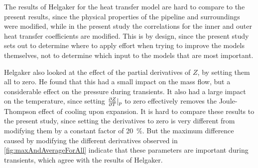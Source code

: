 The results of Helgaker for the heat transfer model are hard to compare to the present results, since the physical properties of the pipeline and surroundings were modified, while in the present study the correlations for the inner and outer heat transfer coefficients are modified. This is by design, since the present study sets out to determine where to apply effort when trying to improve the models themselves, not to determine which input to the models that are most important.

Helgaker also looked at the effect of the partial derivatives of $Z$, by setting them all to zero. He found that this had a small impact on the mass flow, but a considerable effect on the pressure during transients. It also had a large impact on the temperature, since setting $\pd{Z}{T}|_p$ to zero effectively removes the Joule-Thompson effect of cooling upon expansion. It is hard to compare these results to the present study, since setting the derivatives to zero is very different from modifying them by a constant factor of \SI{20}{\percent}. But the maximum difference caused by modifying the different derivatives observed in \cref{fig:maxAndAverageForAll} indicate that these parameters are important during transients, which agree with the results of Helgaker.





